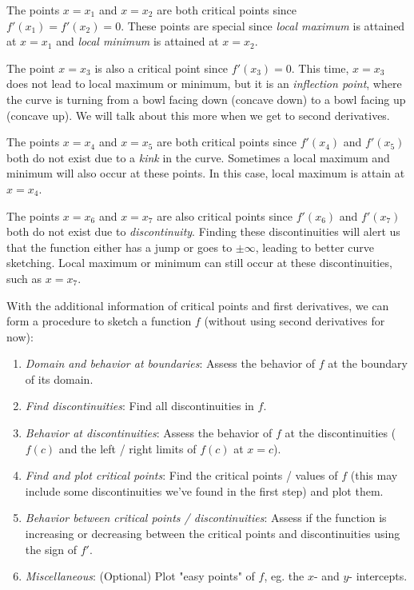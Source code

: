 The points $x = x_1$ and $x = x_2$ are both critical points since $f'(x_1) = f'(x_2) = 0$.  These points are special since \textit{local maximum} is attained at $x = x_1$ and \textit{local minimum} is attained at $x = x_2$.

The point $x = x_3$ is also a critical point since $f'(x_3) = 0$.  This time, $x=x_3$ does not lead to local maximum or minimum, but it is an \textit{inflection point}, where the curve is turning from a bowl facing down (concave down) to a bowl facing up (concave up).  We will talk about this more when we get to second derivatives.

The points $x = x_4$ and $x = x_5$ are both critical points since $f'(x_4)$ and $f'(x_5)$ both do not exist due to a \textit{kink} in the curve.  Sometimes a local maximum and minimum will also occur at these points.  In this case, local maximum is attain at $x = x_4$.

The points $x = x_6$ and $x = x_7$ are also critical points since $f'(x_6)$ and $f'(x_7)$ both do not exist due to \textit{discontinuity}.  Finding these discontinuities will alert us that the function either has a jump or goes to $\pm\infty$, leading to better curve sketching.  Local maximum or minimum can still occur at these discontinuities, such as $x = x_7$.

With the additional information of critical points and first derivatives, we can form a procedure to sketch a function $f$ (without using second derivatives for now):

\begin{enumerate}
    \item \textit{Domain and behavior at boundaries}: Assess the behavior of $f$ at the boundary of its domain.
    \item \textit{Find discontinuities}: Find all discontinuities in $f$.
    \item \textit{Behavior at discontinuities}: Assess the behavior of $f$ at the discontinuities ($f(c)$ and the left / right limits of $f(c)$ at $x=c$).
    \item \textit{Find and plot critical points}: Find the critical points / values of $f$ (this may include some discontinuities we've found in the first step) and plot them.
    \item \textit{Behavior between critical points / discontinuities}: Assess if the function is increasing or decreasing between the critical points and discontinuities using the sign of $f'$.
    \item \textit{Miscellaneous}: (Optional) Plot "easy points" of $f$, eg. the $x$- and $y$- intercepts.
\end{enumerate}

